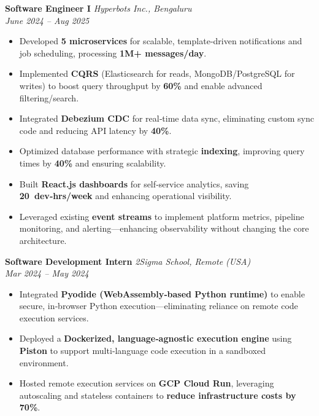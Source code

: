 \documentclass[a4paper,10pt]{article}
\begin{document}
\textbf{Software Engineer I} \hfill \textit{Hyperbots Inc., Bengaluru} \\
\textit{June 2024 – Aug 2025}
\begin{itemize}
  \item Developed \textbf{5 microservices} for scalable, template‑driven notifications and job scheduling, processing \textbf{1M+ messages/day}.
  \item Implemented \textbf{CQRS} (Elasticsearch for reads, MongoDB/PostgreSQL for writes) to boost query throughput by \textbf{60\%} and enable advanced filtering/search.
  \item Integrated \textbf{Debezium CDC} for real‑time data sync, eliminating custom sync code and reducing API latency by \textbf{40\%}.
  \item Optimized database performance with strategic \textbf{indexing}, improving query times by \textbf{40\%} and ensuring scalability.
  \item Built \textbf{React.js dashboards} for self‑service analytics, saving \textbf{20 dev‑hrs/week} and enhancing operational visibility.
 \item Leveraged existing \textbf{event streams} to implement platform metrics, pipeline monitoring, and alerting—enhancing observability without changing the core architecture.
\end{itemize}

\textbf{Software Development Intern} \hfill \textit{2Sigma School, Remote (USA)} \\
\textit{Mar 2024 – May 2024}
\begin{itemize}
  \item Integrated \textbf{Pyodide (WebAssembly‑based Python runtime)} to enable secure, in‑browser Python execution—eliminating reliance on remote code execution services.
  \item Deployed a \textbf{Dockerized, language‑agnostic execution engine} using \textbf{Piston} to support multi‑language code execution in a sandboxed environment.
  \item Hosted remote execution services on \textbf{GCP Cloud Run}, leveraging autoscaling and stateless containers to \textbf{reduce infrastructure costs by 70\%}.
\end{itemize}
\end{document}
